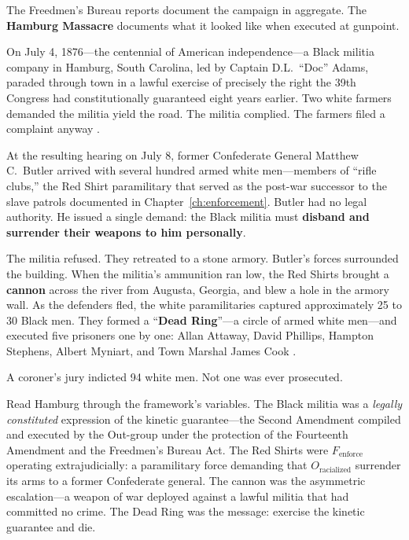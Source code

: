 The Freedmen's Bureau reports document the campaign in aggregate. The \textbf{Hamburg Massacre} documents what it looked like when executed at gunpoint.

\begin{historicalsource}
On July 4, 1876---the centennial of American independence---a Black militia company in Hamburg, South Carolina, led by Captain D.L.\ ``Doc'' Adams, paraded through town in a lawful exercise of precisely the right the 39th Congress had constitutionally guaranteed eight years earlier. Two white farmers demanded the militia yield the road. The militia complied. The farmers filed a complaint anyway \cite{hamburg_zinn, hamburg_ldhi}.

At the resulting hearing on July 8, former Confederate General Matthew C.\ Butler arrived with several hundred armed white men---members of ``rifle clubs,'' the Red Shirt paramilitary that served as the post-war successor to the slave patrols documented in Chapter~\ref{ch:enforcement}. Butler had no legal authority. He issued a single demand: the Black militia must \textbf{disband and surrender their weapons to him personally}.

The militia refused. They retreated to a stone armory. Butler's forces surrounded the building. When the militia's ammunition ran low, the Red Shirts brought a \textbf{cannon} across the river from Augusta, Georgia, and blew a hole in the armory wall. As the defenders fled, the white paramilitaries captured approximately 25 to 30 Black men. They formed a ``\textbf{Dead Ring}''---a circle of armed white men---and executed five prisoners one by one: Allan Attaway, David Phillips, Hampton Stephens, Albert Myniart, and Town Marshal James Cook \cite{hamburg_zinn, hamburg_ldhi}.

A coroner's jury indicted 94 white men. Not one was ever prosecuted.
\end{historicalsource}

Read Hamburg through the framework's variables. The Black militia was a \textit{legally constituted} expression of the kinetic guarantee---the Second Amendment compiled and executed by the Out-group under the protection of the Fourteenth Amendment and the Freedmen's Bureau Act. The Red Shirts were $F_{\text{enforce}}$ operating extrajudicially: a paramilitary force demanding that $O_{\text{racialized}}$ surrender its arms to a former Confederate general. The cannon was the asymmetric escalation---a weapon of war deployed against a lawful militia that had committed no crime. The Dead Ring was the message: exercise the kinetic guarantee and die.

